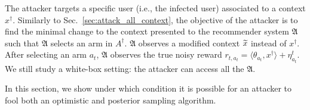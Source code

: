 The attacker targets a specific user (i.e., the infected user) associated to a context $x^\dagger$.
Similarly to Sec.~\ref{sec:attack_all_context}, the objective of the attacker is to find the minimal change to the context presented to the recommender system $\mathfrak{A}$ such that $\mathfrak{A}$ {selects an arm in $A^\dagger$}.
$\mathfrak{A}$ observes a modified context $\widetilde{x}$ instead of $x^\dagger$. After selecting an arm $a_t$, $\mathfrak{A}$ observes the true noisy reward $r_{t,a_t} = \langle \theta_{a_t}, x^{\dagger}\rangle + \eta^t_{a_t}$.
We still study a white-box setting: the attacker can access all the  $\mathfrak{A}$.

In this section, we show under which condition it is possible for an attacker to fool both an optimistic and posterior sampling algorithm.





